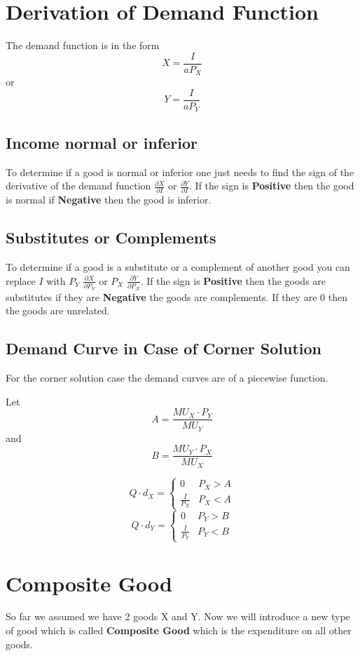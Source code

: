 \documentclass[../ECON-281-Notes.tex]{subfiles}
\begin{document}
\section{Derivation of Demand Function}
The demand function is in the form \[X = \frac{I}{aP_X}\] or \[Y = \frac{I}{aP_Y}\]

\subsection{Income normal or inferior}
To determine if a good is normal or inferior one just needs to find the sign of the derivative of the demand function \(\frac{\partial X}{\partial I}\) or
\(\frac{\partial Y}{\partial I}\). If the sign is \textbf{Positive} then the good is normal if \textbf{Negative} then the good is inferior.

\subsection{Substitutes or Complements}
To determine if a good is a substitute or a complement of another good you can replace \(I\) with \(P_Y\) \(\frac{\partial X}{\partial P_Y}\) or \(P_X\) \(\frac{\partial Y}{\partial P_X}\). If the sign is \textbf{Positive} then the goods are substitutes if they are \textbf{Negative} the goods are complements. If they are 0 then the goods are unrelated.

\subsection{Demand Curve in Case of Corner Solution}
For the corner solution case the demand curves are of a piecewise function.

Let 
\[A = \frac{MU_X\cdot P_Y}{MU_Y}\] 
and 
\[B = \frac{MU_Y\cdot P_X}{MU_X}\]

\[ Q\cdot d_X = 
\begin{cases} 
    0 & P_X > A \\
    \frac{I}{P_X} & P_X < A
\end{cases}
\]
\[ Q\cdot d_Y = 
\begin{cases} 
    0 & P_Y > B \\
    \frac{I}{P_Y} & P_Y < B
\end{cases}
\]

\section{Composite Good}
So far we assumed we have 2 goods X and Y. Now we will introduce a new type of good which is called \textbf{Composite Good} which is the expenditure on all other goods. 
\end{document}

